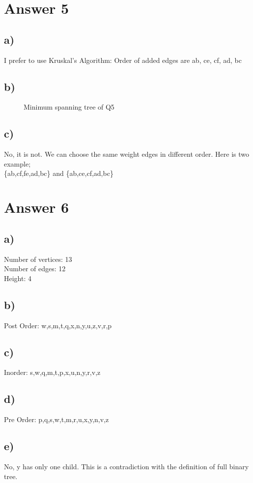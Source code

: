 \documentclass[12pt]{article}
\begin{document}
\section*{Answer 5}
\subsection*{a)}
I prefer to use Kruskal's Algorithm:
Order of added edges are ab, ce, cf, ad, bc

\subsection*{b)}
\begin{figure}[H]
	\centering
	\caption{Minimum spanning tree of Q5}	
	\label{fig:g5}
\end{figure}
\subsection*{c)}
No, it is not. We can choose the same weight edges in different order. Here is two example;\\
\{ab,cf,fe,ad,bc\} and \{ab,ce,cf,ad,bc\}

\section*{Answer 6}
\subsection*{a)}
Number of vertices: 13\\
Number of edges: 12\\
Height: 4
\subsection*{b)}
Post Order: w,s,m,t,q,x,n,y,u,z,v,r,p
\subsection*{c)}
Inorder: s,w,q,m,t,p,x,u,n,y,r,v,z
\subsection*{d)}
Pre Order: p,q,s,w,t,m,r,u,x,y,n,v,z
\subsection*{e)}
No, y has only one child. This is a contradiction with the definition of full binary tree.
\end{document}
